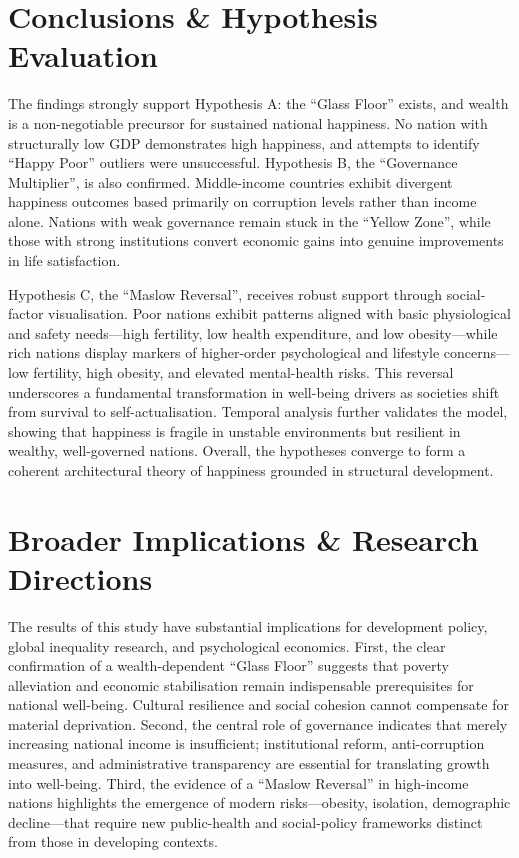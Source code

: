 \documentclass[conference]{IEEEtran}
\begin{document}
\section{Conclusions \& Hypothesis Evaluation}
\noindent
The findings strongly support Hypothesis A: the “Glass Floor” exists, and wealth is a non-negotiable precursor for sustained national happiness. No nation with structurally low GDP demonstrates high happiness, and attempts to identify “Happy Poor” outliers were unsuccessful. Hypothesis B, the “Governance Multiplier”, is also confirmed. Middle-income countries exhibit divergent happiness outcomes based primarily on corruption levels rather than income alone. Nations with weak governance remain stuck in the “Yellow Zone”, while those with strong institutions convert economic gains into genuine improvements in life satisfaction.

Hypothesis C, the “Maslow Reversal”, receives robust support through social-factor visualisation. Poor nations exhibit patterns aligned with basic physiological and safety needs—high fertility, low health expenditure, and low obesity—while rich nations display markers of higher-order psychological and lifestyle concerns—low fertility, high obesity, and elevated mental-health risks. This reversal underscores a fundamental transformation in well-being drivers as societies shift from survival to self-actualisation. Temporal analysis further validates the model, showing that happiness is fragile in unstable environments but resilient in wealthy, well-governed nations. Overall, the hypotheses converge to form a coherent architectural theory of happiness grounded in structural development.
\section*{Broader Implications \& Research Directions}
\noindent
The results of this study have substantial implications for development policy, global inequality research, and psychological economics. First, the clear confirmation of a wealth-dependent “Glass Floor” suggests that poverty alleviation and economic stabilisation remain indispensable prerequisites for national well-being. Cultural resilience and social cohesion cannot compensate for material deprivation. Second, the central role of governance indicates that merely increasing national income is insufficient; institutional reform, anti-corruption measures, and administrative transparency are essential for translating growth into well-being. Third, the evidence of a “Maslow Reversal” in high-income nations highlights the emergence of modern risks—obesity, isolation, demographic decline—that require new public-health and social-policy frameworks distinct from those in developing contexts.
\end{document}
